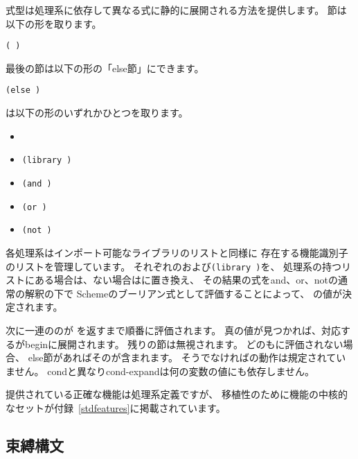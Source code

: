 \begin{entry}{%
}

\syntax
{}式型は処理系に依存して異なる式に静的に展開される方法を提供します。
節は以下の形を取ります。

{\tt(  \dotsfoo)}

最後の節は以下の形の「else節」にできます。

{\tt(else  \dotsfoo)}

は以下の形のいずれかひとつを取ります。

\begin{itemize}
\item {\tt{}}
\item {\tt(library )}
\item {\tt(and  \dotsfoo)}
\item {\tt(or  \dotsfoo)}
\item {\tt(not )}
\end{itemize}

\semantics
各処理系はインポート可能なライブラリのリストと同様に
存在する機能識別子のリストを管理しています。
それぞれのおよび{\tt(library )}を、
処理系の持つリストにある場合は\schtrue{}、ない場合は\schfalse{}に置き換え、
その結果の式を{\cf and}、{\cf or}、{\cf not}の通常の解釈の下で
Schemeのブーリアン式として評価することによって、
の値が決定されます。

次に一連ののが
\schtrue{}を返すまで順番に評価されます。
真の値が見つかれば、対応するが{\cf begin}に展開されます。
残りの節は無視されます。
どのも\schtrue{}に評価されない場合、
else節があればそのが含まれます。
そうでなければの動作は規定されていません。
{\cf cond}と異なり{\cf cond-expand}は何の変数の値にも依存しません。

提供されている正確な機能は処理系定義ですが、
移植性のために機能の中核的なセットが付録~\ref{stdfeatures}に掲載されています。

\end{entry}

\subsection{束縛構文}
\label{bindingsection}

